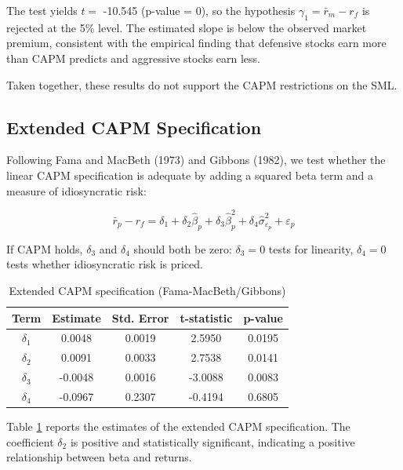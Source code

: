 \documentclass[
]{article}
\begin{document}
The test yields \(t =\) -10.545 (p-value = 0), so the
hypothesis \(\gamma_1 = \bar{r}_m - r_f\) is rejected at the 5\%
level. The estimated slope is below the observed market premium, consistent with the
empirical finding that defensive stocks earn more than CAPM predicts and aggressive
stocks earn less.

Taken together, these results do not support the CAPM restrictions on the SML.

\subsection{Extended CAPM Specification}\label{extended-capm-specification}

Following Fama and MacBeth (1973) and Gibbons (1982), we test whether the linear CAPM specification is adequate by adding a squared beta term and a measure of idiosyncratic risk:

\begin{equation}
\bar{r}_{p} - r_f = \delta_1 + \delta_2 \hat{\beta}_p + \delta_3 \hat{\beta}_p^2 + \delta_4 \hat{\sigma}^2_{\varepsilon_p} + \varepsilon_p
\end{equation}

If CAPM holds, \(\delta_3\) and \(\delta_4\) should both be zero: \(\delta_3 = 0\) tests for linearity, \(\delta_4 = 0\) tests whether idiosyncratic risk is priced.

\begin{table}

\caption{\label{tab:extended-capm}Extended CAPM specification (Fama-MacBeth/Gibbons)}
\centering
\begin{tabular}[t]{ccccc}
\toprule
Term & Estimate & Std. Error & t-statistic & p-value\\
\midrule
$\delta_1$ & 0.0048 & 0.0019 & 2.5950 & 0.0195\\
$\delta_2$ & 0.0091 & 0.0033 & 2.7538 & 0.0141\\
$\delta_3$ & -0.0048 & 0.0016 & -3.0088 & 0.0083\\
$\delta_4$ & -0.0967 & 0.2307 & -0.4194 & 0.6805\\
\bottomrule
\end{tabular}
\end{table}

Table \ref{tab:extended-capm} reports the estimates of the extended CAPM specification. The coefficient \(\delta_2\) is positive and statistically significant, indicating a positive relationship between beta and returns.
\end{document}
